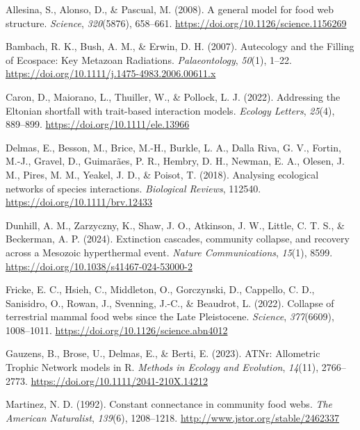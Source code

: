 \documentclass[
]{article}
\newlength{\cslhangindent}
\newenvironment{CSLReferences}[2] %
 {\begin{list}{}{%
  \setlength{\itemindent}{0pt}
  \setlength{\leftmargin}{0pt}
  \setlength{\parsep}{0pt}
  \ifodd #1
   \setlength{\leftmargin}{\cslhangindent}
   \setlength{\itemindent}{-1\cslhangindent}
  \fi
  \setlength{\itemsep}{#2\baselineskip}}}
 {\end{list}}
\begin{document}
\label{refs}
\begin{CSLReferences}{1}{0}
Allesina, S., Alonso, D., \& Pascual, M. (2008). A general model for
food web structure. \emph{Science}, \emph{320}(5876), 658--661.
\url{https://doi.org/10.1126/science.1156269}

Bambach, R. K., Bush, A. M., \& Erwin, D. H. (2007). Autecology and the
Filling of Ecospace: Key Metazoan Radiations. \emph{Palaeontology},
\emph{50}(1), 1--22.
\url{https://doi.org/10.1111/j.1475-4983.2006.00611.x}

Caron, D., Maiorano, L., Thuiller, W., \& Pollock, L. J. (2022).
Addressing the Eltonian shortfall with trait-based interaction models.
\emph{Ecology Letters}, \emph{25}(4), 889--899.
\url{https://doi.org/10.1111/ele.13966}

Delmas, E., Besson, M., Brice, M.-H., Burkle, L. A., Dalla Riva, G. V.,
Fortin, M.-J., Gravel, D., Guimarães, P. R., Hembry, D. H., Newman, E.
A., Olesen, J. M., Pires, M. M., Yeakel, J. D., \& Poisot, T. (2018).
Analysing ecological networks of species interactions. \emph{Biological
Reviews}, 112540. \url{https://doi.org/10.1111/brv.12433}

Dunhill, A. M., Zarzyczny, K., Shaw, J. O., Atkinson, J. W., Little, C.
T. S., \& Beckerman, A. P. (2024). Extinction cascades, community
collapse, and recovery across a Mesozoic hyperthermal event.
\emph{Nature Communications}, \emph{15}(1), 8599.
\url{https://doi.org/10.1038/s41467-024-53000-2}

Fricke, E. C., Hsieh, C., Middleton, O., Gorczynski, D., Cappello, C.
D., Sanisidro, O., Rowan, J., Svenning, J.-C., \& Beaudrot, L. (2022).
Collapse of terrestrial mammal food webs since the Late Pleistocene.
\emph{Science}, \emph{377}(6609), 1008--1011.
\url{https://doi.org/10.1126/science.abn4012}

Gauzens, B., Brose, U., Delmas, E., \& Berti, E. (2023). ATNr:
Allometric Trophic Network models in R. \emph{Methods in Ecology and
Evolution}, \emph{14}(11), 2766--2773.
\url{https://doi.org/10.1111/2041-210X.14212}

Martinez, N. D. (1992). Constant connectance in community food webs.
\emph{The American Naturalist}, \emph{139}(6), 1208--1218.
\url{http://www.jstor.org/stable/2462337}


\end{CSLReferences}
\end{document}
